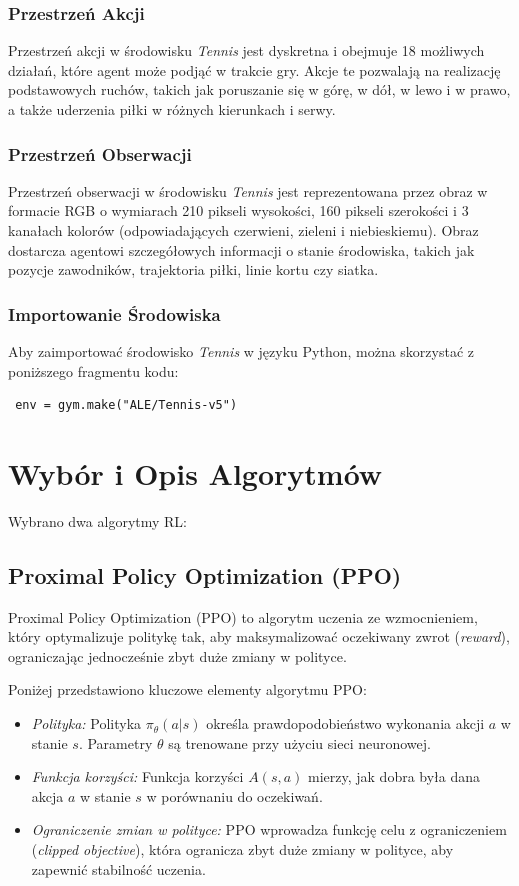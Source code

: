 \documentclass[conference]{IEEEtran}
\begin{document}
\subsubsection{Przestrzeń Akcji}
Przestrzeń akcji w środowisku \textit{Tennis} jest dyskretna i obejmuje 18 możliwych działań, które agent może podjąć w trakcie gry. Akcje te pozwalają na realizację podstawowych ruchów, takich jak poruszanie się w górę, w dół, w lewo i w prawo, a także   uderzenia piłki w różnych kierunkach i serwy.


\subsubsection{Przestrzeń Obserwacji}

Przestrzeń obserwacji w środowisku \textit{Tennis} jest reprezentowana przez obraz w formacie RGB o wymiarach 210 pikseli wysokości, 160 pikseli szerokości i 3 kanałach kolorów (odpowiadających czerwieni, zieleni i niebieskiemu). Obraz dostarcza agentowi szczegółowych informacji o stanie środowiska, takich jak pozycje zawodników, trajektoria piłki, linie kortu czy siatka.




\subsubsection{Importowanie Środowiska} Aby zaimportować środowisko \textit{Tennis} w języku Python, można skorzystać z poniższego fragmentu kodu: \begin{verbatim} env = gym.make("ALE/Tennis-v5") \end{verbatim}


\section{Wybór i Opis Algorytmów}
Wybrano dwa algorytmy RL:

\subsection{Proximal Policy Optimization (PPO)}

Proximal Policy Optimization (PPO) to algorytm uczenia ze wzmocnieniem, który optymalizuje politykę tak, aby maksymalizować oczekiwany zwrot (\textit{reward}), ograniczając jednocześnie zbyt duże zmiany w polityce.

Poniżej przedstawiono kluczowe elementy algorytmu PPO:
\begin{itemize}
    \item \textit{Polityka:} Polityka $\pi_\theta(a|s)$ określa prawdopodobieństwo wykonania akcji $a$ w stanie $s$. Parametry $\theta$ są trenowane przy użyciu sieci neuronowej.
    \item \textit{Funkcja korzyści:} Funkcja korzyści $A(s, a)$ mierzy, jak dobra była dana akcja $a$ w stanie $s$ w porównaniu do oczekiwań.
    \item \textit{Ograniczenie zmian w polityce:} PPO wprowadza funkcję celu z ograniczeniem (\textit{clipped objective}), która ogranicza zbyt duże zmiany w polityce, aby zapewnić stabilność uczenia.
\end{itemize}
\end{document}
